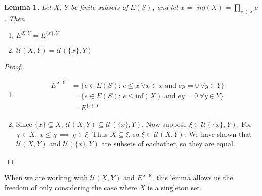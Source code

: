 \documentclass[12pt]{article}
\newtheorem{lemma}[theorem]{Lemma}
\theoremstyle{definition}
\begin{document}
\begin{lemma} Let $X$, $Y$ be finite subsets of $E(S)$, and let $x =$ inf$(X) = \prod_{e \in X} e$. Then
    \begin{enumerate}
        \item[(i)] $E^{X, Y} = E^{\{x\}, Y}$
        \item[(ii)] $\mathcal{U}(X, Y) = \mathcal{U}(\{x\}, Y)$
    \end{enumerate}
\end{lemma}
\begin{proof}
    \begin{enumerate}
        \item[(i)] 
            \begin{align*}
                E^{X, Y} &= \{ e \in E(S)\text{: } e \leq x \ \forall x \in x \text{ and } ey = 0 \ \forall y \in Y \} \\
                         &= \{ e \in E(S)\text{: } e \leq \text{inf}(X) \text{ and } ey = 0 \ \forall y \in Y \} \\
                         &= E^{\{x\}, Y}
            \end{align*}
        \item[(ii)]
            Since $\{x\} \subseteq X$, $\mathcal{U}(X, Y) \subseteq \mathcal{U}(\{x\}, Y)$. Now suppose $\xi \in \mathcal{U}(\{x\}, Y)$.
            For $\chi \in X$, $x \leq \chi \implies \chi \in \xi$. Thus $X \subseteq \xi$, so $\xi \in \mathcal{U}(X, Y)$. We have
            shown that $\mathcal{U}(X, Y)$ and $\mathcal{U}(\{x\}, Y)$ are subsets of eachother, so they are equal.
    \end{enumerate}
\end{proof}
When we are working with $\mathcal{U}(X, Y)$ and $E^{X, Y}$, this lemma allows us the freedom of only considering the case
where $X$ is a singleton set.
\end{document}
